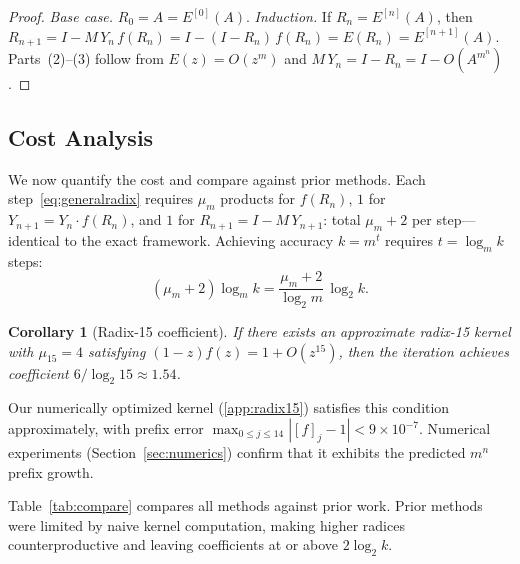 \documentclass[
  journal=largetwo,
  manuscript=article,
  manuscriptlabel={Research Preprint},
  logo=false,
  simfonts=false,
  year=2026,
  volume=1,
]{cup-journal}
\newtheorem{corollary}[theorem]{Corollary}
\theoremstyle{definition}
\theoremstyle{remark}
\begin{document}
\begin{proof}
  \emph{Base case.} $R_0 = A = E^{[0]}(A)$.
  \emph{Induction.} If $R_n = E^{[n]}(A)$, then
  $R_{n+1} = I - M\,Y_n\,f(R_n) = I - (I - R_n)\,f(R_n)
   = E(R_n) = E^{[n+1]}(A)$.
  Parts~(2)--(3) follow from $E(z) = O(z^m)$ and
  $M\,Y_n = I - R_n = I - O(A^{m^n})$.
\end{proof}



\subsection{Cost Analysis}
\label{sec:comparison}

We now quantify the cost and compare against prior methods.
Each step~\eqref{eq:generalradix} requires $\mu_m$ products for
$f(R_n)$, $1$ for $Y_{n+1} = Y_n \cdot f(R_n)$, and $1$ for
$R_{n+1} = I - M\,Y_{n+1}$: total $\mu_m + 2$ per
step---identical to the exact framework.
Achieving accuracy $k = m^t$ requires $t = \log_m k$ steps:
\begin{equation}
  \label{eq:generalcost}
  (\mu_m + 2)\log_m k
  = \frac{\mu_m + 2}{\log_2 m}\,\log_2 k.
\end{equation}

\begin{corollary}[Radix-15 coefficient]
  \label{cor:radix15coeff}
  If there exists an approximate radix-15 kernel with $\mu_{15} = 4$
  satisfying $(1-z)f(z) = 1 + O(z^{15})$, then the iteration
  achieves coefficient $6/\log_2 15 \approx 1.54$.
\end{corollary}

Our numerically optimized kernel (\ref{app:radix15}) satisfies
this condition approximately, with prefix error
$\max_{0 \leq j \leq 14}|[f]_j - 1| < 9 \times 10^{-7}$.
Numerical experiments (Section~\ref{sec:numerics}) confirm that it
exhibits the predicted $m^n$ prefix growth.

Table~\ref{tab:compare} compares all methods against prior work.
Prior methods were limited by naive kernel computation, making higher
radices counterproductive and leaving coefficients at or above $2\log_2 k$.
\end{document}
